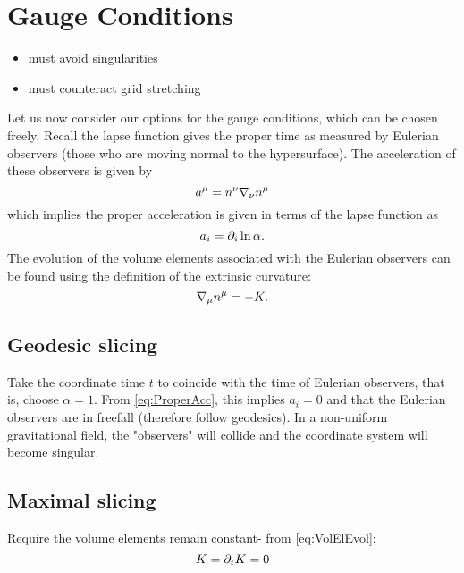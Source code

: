 \section{Gauge Conditions}
\begin{itemize}
\item must avoid singularities
\item must counteract grid stretching
\end{itemize}

Let us now consider our options for the gauge conditions, which can be chosen freely. Recall the lapse function gives the proper time as measured by Eulerian observers (those who are moving normal to the hypersurface). The acceleration of these observers is given by 
\begin{equation}
a^\mu = n^\nu {\nabla}_\nu n^\mu
\end{equation} 
which implies the proper acceleration is given in terms of the lapse function as 
\begin{equation}\label{eq:ProperAcc}
a_i = {\partial}_i \ln \alpha.
\end{equation}
The evolution of the volume elements associated with the Eulerian observers can be found using the definition of the extrinsic curvature:
\begin{equation}\label{eq:VolElEvol}
{\nabla}_{\mu}n^{\mu}=-K.
\end{equation}

\subsection{Geodesic slicing}
Take the coordinate time $t$ to coincide with the time of Eulerian observers, that is, choose $\alpha=1$. From \ref{eq:ProperAcc}, this implies $a_i=0$ and that the Eulerian observers are in freefall (therefore follow geodesics). In a non-uniform gravitational field, the "observers" will collide and the coordinate system will become singular.

\subsection{Maximal slicing}
Require the volume elements remain constant- from  \ref{eq:VolElEvol}:
\begin{equation}
K = {\partial}_t K =0
\end{equation}

\pagebreak



